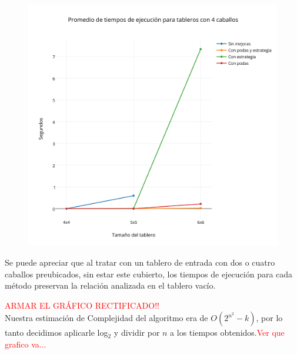  \begin{figure}[h!]
   \begin{center}
   \includegraphics[scale=0.3]{../src/ej3/Mediciones/4caballos/promedios1.png} 
   \end{center}
 \end{figure}
 
Se puede apreciar que al tratar con un tablero de entrada con dos o cuatro caballos preubicados, sin estar este cubierto, los tiempos de ejecución para cada método preservan la relación analizada en el tablero vacío.\\

\newpage

\textcolor{red}{{\LARGE ARMAR EL GRÁFICO RECTIFICADO!!}}\\

Nuestra estimación de Complejidad del algoritmo era de $O(2^{n^2}-k)$, por lo tanto decidimos aplicarle log$_2$ y dividir por $n$ a los tiempos obtenidos.\textcolor{red}{Ver que grafico va...}

\begin{figure}[h!]
   \begin{center}
   \end{center}
 \end{figure}
 
